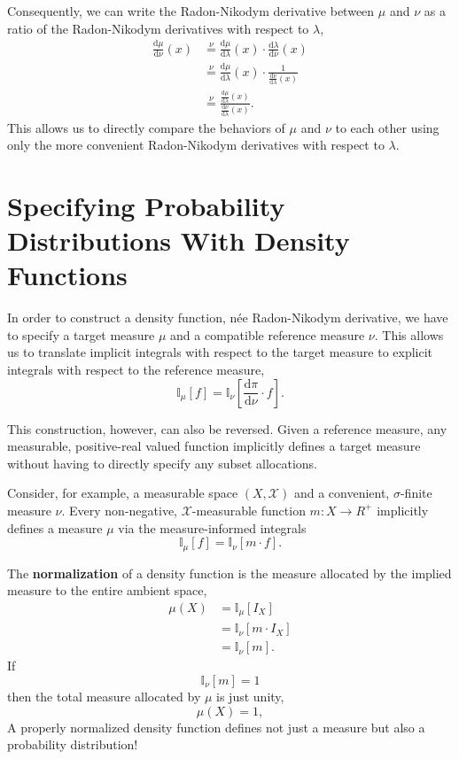 \documentclass[
  letterpaper,
  DIV=11,
  numbers=noendperiod]{scrartcl}
\begin{document}
Consequently, we can write the Radon-Nikodym derivative between \(\mu\)
and \(\nu\) as a ratio of the Radon-Nikodym derivatives with respect to
\(\lambda\), \begin{align*}
\frac{ \mathrm{d} \mu}{ \mathrm{d} \nu}(x)
&\overset{\nu}{=}
\frac{ \mathrm{d} \mu}{ \mathrm{d} \lambda }(x) \cdot
\frac{ \mathrm{d} \lambda}{ \mathrm{d} \nu }(x)
\\
&\overset{\nu}{=}
\frac{ \mathrm{d} \mu}{ \mathrm{d} \lambda }(x) \cdot
\frac{1}{ \frac{ \mathrm{d} \nu}{ \mathrm{d} \lambda }(x) }
\\
&\overset{\nu}{=}
\frac{ \frac{ \mathrm{d} \mu}{ \mathrm{d} \lambda }(x) }
{ \frac{ \mathrm{d} \nu}{ \mathrm{d} \lambda }(x) }.
\end{align*} This allows us to directly compare the behaviors of \(\mu\)
and \(\nu\) to each other using only the more convenient Radon-Nikodym
derivatives with respect to \(\lambda\).

\section{Specifying Probability Distributions With Density
Functions}\label{specifying-probability-distributions-with-density-functions}

In order to construct a density function, née Radon-Nikodym derivative,
we have to specify a target measure \(\mu\) and a compatible reference
measure \(\nu\). This allows us to translate implicit integrals with
respect to the target measure to explicit integrals with respect to the
reference measure, \[
\mathbb{I}_{\mu}[f] =
\mathbb{I}_{\nu}
\left[ \frac{ \mathrm{d} \pi}{ \mathrm{d} \nu } \cdot f \right].
\]

This construction, however, can also be reversed. Given a reference
measure, any measurable, positive-real valued function implicitly
defines a target measure without having to directly specify any subset
allocations.

Consider, for example, a measurable space \((X, \mathcal{X})\) and a
convenient, \(\sigma\)-finite measure \(\nu\). Every non-negative,
\(\mathcal{X}\)-measurable function \(m : X \rightarrow R^{+}\)
implicitly defines a measure \(\mu\) via the measure-informed integrals
\[
\mathbb{I}_{\mu}[f] = \mathbb{I}_{\nu} \left[ m \cdot f \right].
\]

The \textbf{normalization} of a density function is the measure
allocated by the implied measure to the entire ambient space,
\begin{align*}
\mu(X)
&=
\mathbb{I}_{\mu}[I_{X}]
\\
&=
\mathbb{I}_{\nu} [ m \cdot I_{X} ]
\\
&=
\mathbb{I}_{\nu} [ m ].
\end{align*} If \[
\mathbb{I}_{\nu}[ m ] = 1
\] then the total measure allocated by \(\mu\) is just unity, \[
\mu(X) = 1,
\] A properly normalized density function defines not just a measure but
also a probability distribution!
\end{document}
